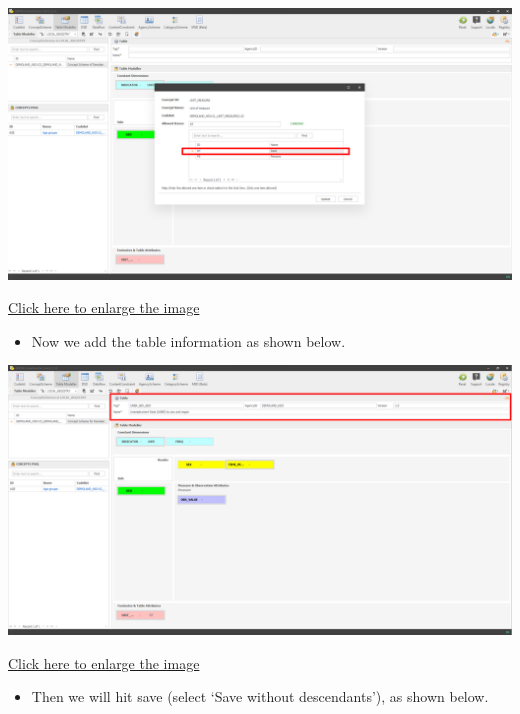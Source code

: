 \documentclass[
]{book}
\providecommand{\tightlist}{%
  \setlength{\itemsep}{0pt}\setlength{\parskip}{0pt}}
\begin{document}
\begin{center}\includegraphics[width=1\linewidth]{./images/image140} \end{center}

\href{images/image140.png}{Click here to enlarge the image}

\begin{itemize}
\tightlist
\item
  Now we add the table information as shown below.
\end{itemize}

\begin{center}\includegraphics[width=1\linewidth]{./images/image142} \end{center}

\href{images/image142.png}{Click here to enlarge the image}

\begin{itemize}
\tightlist
\item
  Then we will hit save (select `Save without descendants'), as shown below.
\end{itemize}
\end{document}
